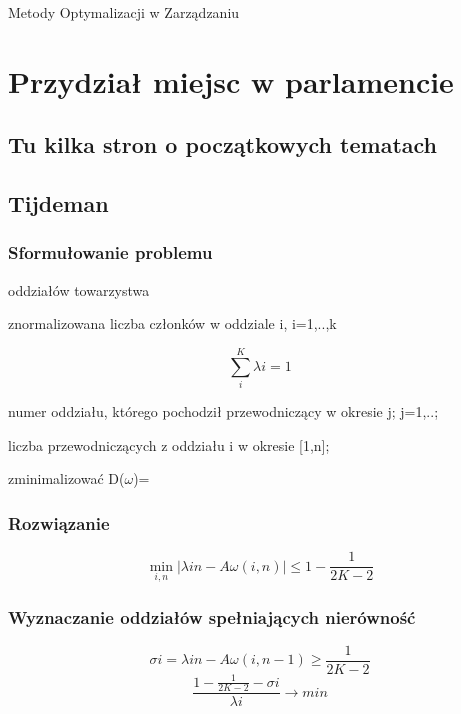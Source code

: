 \documentclass[12pt,a4paper]{article}
\begin{document}
\lstset{language=Pascal}
Metody Optymalizacji w Zarządzaniu
\newpage
\tableofcontents
\section{Przydział miejsc w parlamencie}
\subsection{Tu kilka stron o początkowych tematach}

\newpage
\subsection{Tijdeman}
\subsubsection{Sformułowanie problemu}
\begin{description}
\item[k] oddziałów towarzystwa
\item[$\lambda$i] znormalizowana liczba członków w oddziale i, i=1,..,k
\item \begin{equation}
\sum \limits_{i}^{K} \lambda i = 1
\end{equation}
\item[$\omega$i] numer oddziału, którego pochodził przewodniczący w okresie j; j=1,..;
\item[A$\omega$(i,n)] liczba przewodniczących z oddziału i w okresie [1,n]; 
\item zminimalizować D($\omega$)=
\end{description}

\subsubsection{Rozwiązanie}
\begin{equation}
\min\limits_{i,n}\left | \lambda in - A\omega(i,n)\right | \leq 1-\frac{1}{2K-2}
\end{equation}
\subsubsection{Wyznaczanie oddziałów spełniających nierówność}
\begin{equation}
\sigma i = \lambda in - A\omega (i,n-1) \geq \frac{1}{2K-2}
\end{equation}
\begin{equation}
\frac{1-\frac{1}{2K-2}-\sigma i}{\lambda i} \to min
\end{equation}
\end{document}

